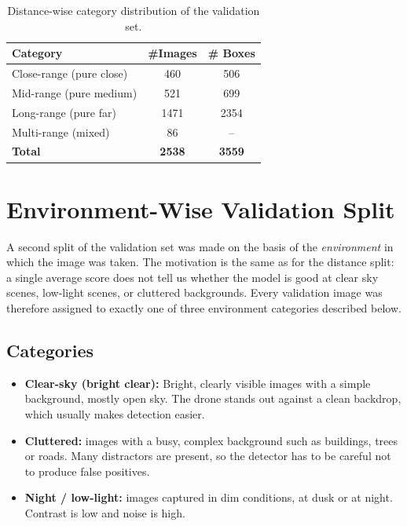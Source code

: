 \documentclass[12pt,a4paper]{report}
\begin{document}
\begin{table}[H]
\centering
\caption{Distance-wise category distribution of the validation set.}
\label{tab:dist-counts}
\begin{tabular}{lcc}
\toprule
\textbf{Category}                & \textbf{\#Images} & \textbf{\# Boxes} \\
\midrule
Close-range  (pure close)        &  460  &  506  \\
Mid-range    (pure medium)       &  521  &  699  \\
Long-range   (pure far)          & 1471  & 2354  \\
Multi-range  (mixed)             &   86  &  --   \\
\midrule
\textbf{Total}                   & \textbf{2538} & \textbf{3559} \\
\bottomrule
\end{tabular}
\end{table}

\section{Environment-Wise Validation Split}
\label{sec:env-split}
A second split of the validation set was made on the basis of the
\emph{environment} in which the image was taken. The motivation is the same as
for the distance split: a single average score does not tell us whether the
model is good at clear sky scenes, low-light scenes, or cluttered backgrounds.
Every validation image was therefore assigned to exactly one of three
environment categories described below.

\subsection{Categories}
\begin{itemize}[noitemsep]
    \item \textbf{Clear-sky (bright clear):} Bright, clearly visible images with a simple background, mostly open sky. The drone stands out against a clean backdrop, which usually makes detection easier.
    \item \textbf{Cluttered:} images with a busy, complex background such as
          buildings, trees or roads. Many distractors are present, so the
          detector has to be careful not to produce false positives.
    \item \textbf{Night / low-light:} images captured in
          dim conditions, at dusk or at night. Contrast is low and noise is
          high.
\end{itemize}
\end{document}
